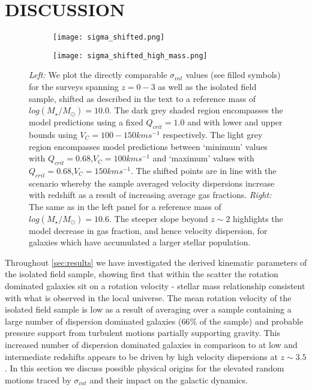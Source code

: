 \documentclass[fleqn,usenatbib]{mn2e}
\begin{document}
\section{DISCUSSION}\label{sec:discussion}


\begin{figure*}
    \centering \hspace{-1.3cm}
    \begin{subfigure}[h!]{0.5\textwidth}
        \centering
        \texttt{[image: sigma\_shifted.png]}
    \end{subfigure} \hspace{+0.4cm}
    \begin{subfigure}[h!]{0.5\textwidth}
        \centering
        \texttt{[image: sigma\_shifted\_high\_mass.png]}
    \end{subfigure}
    \caption{{\it Left:} We plot the directly comparable $\sigma_{int}$ values (see filled symbols) for the surveys spanning $z=0-3$ as well as the isolated field sample, shifted as described in the text to a reference mass of $log(M_{\star}/M_{\odot}) = 10.0$.
    The dark grey shaded region encompasses the model predictions using a fixed $Q_{crit} = 1.0$ and with lower and upper bounds using $V_{C} = 100-150kms^{-1}$ respectively.
    The light grey region encompasses model predictions between `minimum' values with $Q_{crit} = 0.68$,$V_{C}=100kms^{-1}$ and `maximum' values with $Q_{crit} = 0.68$,$V_{C}=150kms^{-1}$.
    The shifted points are in line with the scenario whereby the sample averaged velocity dispersions increase with redshift as a result of increasing average gas fractions. 
    {\it Right:} The same as in the left panel for a reference mass of $log(M_{\star}/M_{\odot}) = 10.6$.
    The steeper slope beyond $z\sim2$ highlights the model decrease in gas fraction, and hence velocity dispersion, for galaxies which have accumulated a larger stellar population.}
    \label{fig:sigma_shifted}
\end{figure*}

Throughout \cref{sec:results} we have investigated the derived kinematic parameters of the isolated field sample, showing first that within the scatter the rotation dominated galaxies sit on a rotation velocity - stellar mass relationship consistent with what is observed in the local universe.
The mean rotation velocity of the isolated field sample is low as a result of averaging over a sample containing a large number of dispersion dominated galaxies ($66\%$ of the sample) and probable pressure support from turbulent motions \citep[e.g.][]{Burkert2010} partially supporting gravity.
This increased number of dispersion dominated galaxies in comparison to at low and intermediate redshifts appears to be driven by high velocity dispersions at $z\sim3.5$.
In this section we discuss possible physical origins for the elevated random motions traced by $\sigma_{int}$ and their impact on the galactic dynamics.
\end{document}
